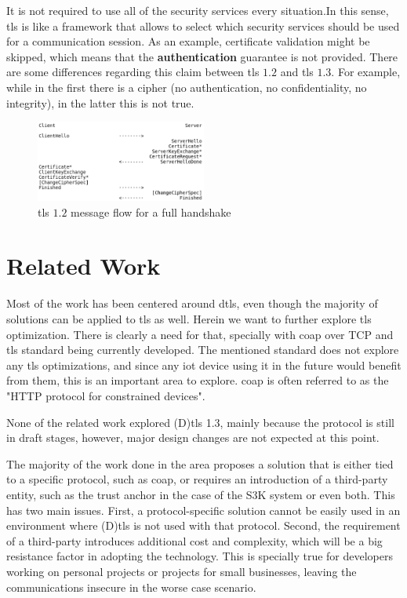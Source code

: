 \documentclass[conference]{IEEEtran}
\begin{document}
It is not required to use all of the security services every situation.In this sense, \gls{tls} is like a framework that allows to select which security services should be used for a communication session. As an example,
certificate validation might be skipped, which means that the \textbf{authentication} guarantee is not provided. There are some differences regarding this claim between \gls{tls} $1.2$\cite{RFC5246}
and \gls{tls} $1.3$\cite{I-D.ietf-tls-tls13}. For example, while in the first there is a 
cipher (no authentication, no confidentiality, no integrity), in the latter
this is not true.

\begin{figure}
        \centering
        \includegraphics[width=0.5\textwidth]{../thesis/img/tls-12-full-handshake3.png} %
        \caption{\label{fig:tls-12-handshake} \gls{tls} $1.2$ message flow for a full handshake}
\end{figure}


\section{Related Work}

Most of the work has been centered around \gls{dtls},
even though the majority of solutions can be applied to \gls{tls} as well.
Herein we want to further explore \gls{tls} optimization. There is clearly a need for that, specially with \gls{coap} over
TCP and \gls{tls} standard being currently developed\cite{I-D.ietf-core-coap-tcp-tls}. The mentioned standard does not explore any \gls{tls}
optimizations, and since any \gls{iot} device using it in the future would benefit from
them, this is an important area to explore. \gls{coap}\cite{RFC7959} is often
referred to as the "HTTP protocol for constrained devices".

None of the related work explored
(D)\gls{tls} 1.3, mainly because the protocol is still in draft stages, however, major design changes are not expected at this point.

The majority of the work done in the area proposes a solution that is either tied to a
specific protocol, such as \gls{coap}, or requires an introduction of a third-party
entity, such as the trust anchor in the case of the S3K system\cite{S3KScala62:online} or
even both. This has two main issues. First, a protocol-specific solution cannot
be easily used in an environment where (D)\gls{tls} is not used with that protocol. Second, the requirement of a third-party
introduces additional cost and complexity, which will be a big resistance factor
in adopting the technology. This is specially true for developers working on
personal projects or projects for small businesses, leaving the communications insecure
in the worse case scenario.
\end{document}
